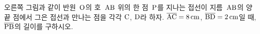 \noindent\begin{minipage}[t]{0.58\linewidth}\vspace{0pt}\raggedright 오른쪽 그림과 같이 반원~$\mathrm{O}$의 호~$\mathrm{AB}$ 위의 한 점~$\mathrm{P}$를 지나는 접선이 지름~$\mathrm{AB}$의 양 끝 점에서 그은 접선과 만나는 점을 각각 $\mathrm{C}$, $\mathrm{D}$라 하자. $\overline{\mathrm{AC}}=8\,\mathrm{cm}$, $\overline{\mathrm{BD}}=2\,\mathrm{cm}$일 때, $\overline{\mathrm{PB}}$의 길이를 구하시오.\end{minipage}\hfill\begin{minipage}[t]{0.4\linewidth}\vspace{0pt}\centering \resizebox{\ifdim\width>\linewidth\linewidth\else\width\fi}{!}{}\end{minipage}\par
